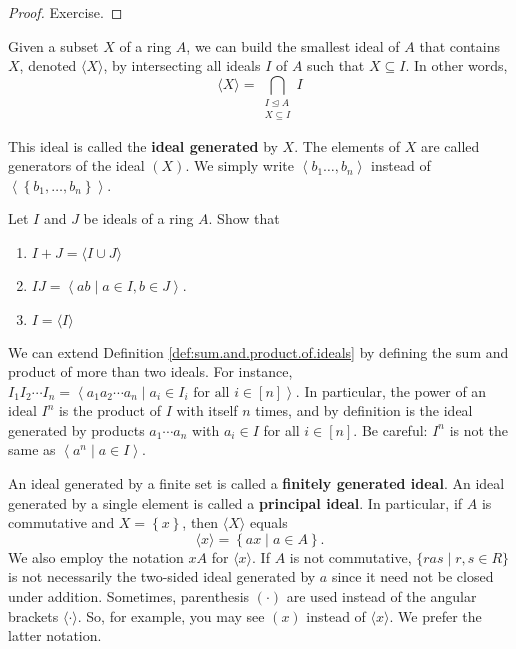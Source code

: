\documentclass[11pt,a4paper]{article}
\begin{document}
\begin{proof}
    Exercise.
\end{proof}



Given a subset \(X\) of a ring \(A\), we can build the smallest ideal of \(A\) that contains \(X\), denoted \(\langle X\rangle\), by intersecting all ideals \(I\) of \(A\) such that \(X\subseteq I\).
In other words,
\[
\langle X \rangle = \mathop{\bigcap}\limits_{\substack{I \trianglelefteq A \\ X \subseteq I}} I
\]

This ideal is called the \textbf{ideal generated} by \(X\).
The elements of $X$ are called generators of the ideal $(X)$.
We simply write $\left\langle b_1 \ldots, b_n\right\rangle$ instead of $\left\langle\left\{b_1, \ldots, b_n\right\}\right\rangle$.

\begin{eje}
Let \(I\) and \(J\) be ideals of a ring \(A\).
Show that 
\begin{enumerate}[label=(\roman*)]
    \item \(I+J=\langle I \cup J\rangle\)
    \item \(IJ = \left< ab\mid a\in I, b\in J\right> \).
    \item \(I = \langle I\rangle \)
\end{enumerate}
\end{eje}

\begin{rem}
We can extend Definition \ref{def:sum.and.product.of.ideals} by defining  the sum and product of more than two ideals.
For instance, \(I_1I_2 \cdots I_n = \left<  a_1a_2\cdots a_n \mid a_i \in I_i \text{ for all }i\in [n] \right>\).
In particular, the power of an ideal \(I^n\) is the product of \(I\) with itself \(n\) times, and by definition is the ideal generated by products \(a_1\cdots a_n\) with \(a_i\in I\) for all \(i\in[n]\).
Be careful: \(I^n\) is not the same as \(\left< a^n \mid a\in I\right>\).
\end{rem}

An ideal generated by a finite set is called a \textbf{finitely generated ideal}.
An ideal generated by a single element is called a \textbf{principal ideal}.
In particular, if \(A\) is commutative and  \(X = \left\{ x \right\}\), then \(\langle X \rangle\) equals  
\[\langle x\rangle = \left\{ ax\mid a\in A \right\}.\]
We also employ the notation \(xA\) for \(\langle x\rangle\).
If $A$ is not commutative, $\{r a s \mid r, s \in R\}$ is not necessarily the two-sided ideal generated by $a$ since it need not be closed under addition.
Sometimes, parenthesis \((\cdot)\) are used instead of the angular brackets \(\langle \cdot \rangle\).
So, for example, you may see \((x)\) instead of \(\langle x\rangle\).
We prefer the latter notation.
\end{document}
